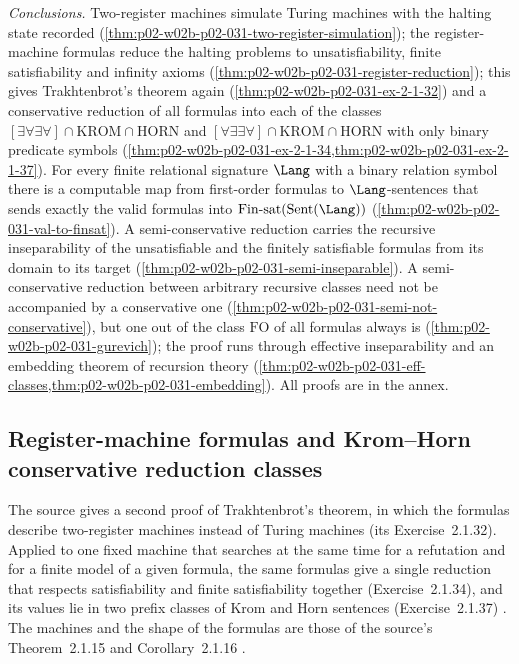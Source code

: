 \emph{Conclusions.}  Two-register machines simulate Turing machines with the
halting state recorded (\cref{thm:p02-w02b-p02-031-two-register-simulation});
the register-machine formulas reduce the halting problems to unsatisfiability,
finite satisfiability and infinity axioms
(\cref{thm:p02-w02b-p02-031-register-reduction}); this gives Trakhtenbrot's
theorem again (\cref{thm:p02-w02b-p02-031-ex-2-1-32}) and a conservative
reduction of all formulas into each of the classes
\([\exists\forall\exists\forall]\cap\mathrm{KROM}\cap\mathrm{HORN}\) and
\([\forall\exists\exists\forall]\cap\mathrm{KROM}\cap\mathrm{HORN}\) with only
binary predicate symbols
(\cref{thm:p02-w02b-p02-031-ex-2-1-34,thm:p02-w02b-p02-031-ex-2-1-37}).
For every finite relational signature \(\Lang\) with a
binary relation symbol there is a computable map from first-order formulas
to \(\Lang\)-sentences that sends exactly the valid formulas into
\(\mathrm{Fin\text{-}sat}(\operatorname{Sent}(\Lang))\)
(\cref{thm:p02-w02b-p02-031-val-to-finsat}).  A semi-conservative reduction
carries the recursive inseparability of the unsatisfiable and the finitely
satisfiable formulas from its domain to its target
(\cref{thm:p02-w02b-p02-031-semi-inseparable}).  A semi-conservative
reduction between arbitrary recursive classes need not be accompanied by a
conservative one (\cref{thm:p02-w02b-p02-031-semi-not-conservative}), but
one out of the class \(\mathrm{FO}\) of all formulas always is
(\cref{thm:p02-w02b-p02-031-gurevich}); the proof runs through effective
inseparability and an embedding theorem of recursion theory
(\cref{thm:p02-w02b-p02-031-eff-classes,thm:p02-w02b-p02-031-embedding}).
All proofs are in the annex.

\subsection{Register-machine formulas and Krom--Horn conservative reduction classes}
\label{sec:p02-w02b-p02-031-register}

The source gives a second proof of Trakhtenbrot's theorem, in which the
formulas describe two-register machines instead of Turing machines
(its Exercise~2.1.32).  Applied to one fixed machine that searches at the same
time for a refutation and for a finite model of a given formula, the same
formulas give a single reduction that respects satisfiability and finite
satisfiability together (Exercise~2.1.34), and its values lie in two prefix
classes of Krom and Horn sentences (Exercise~2.1.37)
\cite[Sect.~2.1.2, pp.~36--37]{BorgerGradelGurevich1997}.  The machines and the
shape of the formulas are those of the source's Theorem~2.1.15 and
Corollary~2.1.16 \cite[Sect.~2.1.1, pp.~27--29]{BorgerGradelGurevich1997}.

